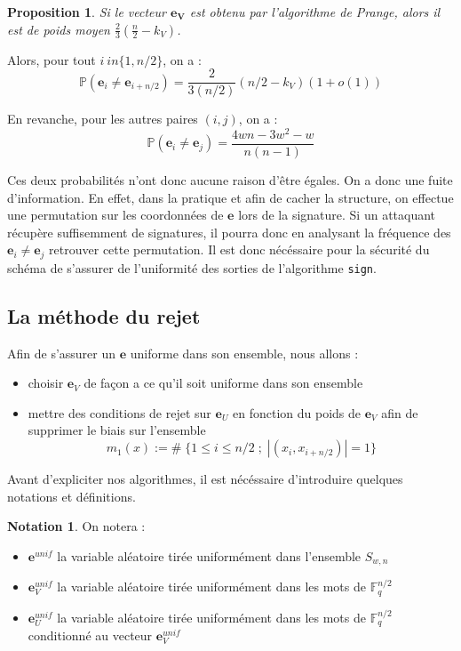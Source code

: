 \documentclass[12pt]{article}
\theoremstyle{plain}
\newtheorem{propo}[thm]{Proposition}
\theoremstyle{definition}
\newtheorem{nota}[thm]{Notation}
\newcommand{\F}{\mathbb{F}}
\newcommand{\e}{\mathbf{e}}
\begin{document}
\begin{propo}
Si le vecteur $\mathbf{e_V}$ est obtenu par l'algorithme de Prange, alors il est de poids moyen $\frac{2}{3}(\frac{n}{2}-k_V)$.
\end{propo}



Alors, pour tout $i \ in \{1,n/2\}$, on a :
$$ \mathbb{P}(\mathbf{e}_i \neq \mathbf{e}_{i+n/2}) = \frac{2}{3(n/2)}(n/2-k_V)(1+o(1))$$

\noindent En revanche, pour les autres paires $(i,j)$, on a :
$$ \mathbb{P}(\mathbf{e}_i \neq \mathbf{e}_{j}) = \frac{4wn - 3w^2-w}{n(n-1)}$$

Ces deux probabilités n'ont donc aucune raison d'être égales. On a donc une fuite d'information. En effet, dans la pratique et afin de cacher la structure, on effectue une permutation sur les coordonnées de $\mathbf{e}$ lors de la signature. Si un attaquant récupère suffisemment de signatures, il pourra donc en analysant la fréquence des $\mathbf{e}_i \neq \mathbf{e}_j$ retrouver cette permutation. Il est donc nécéssaire pour la sécurité du schéma de s'assurer de l'uniformité des sorties de l'algorithme \verb|sign|.

\subsection{La méthode du rejet}
Afin de s'assurer un $\mathbf{e}$ uniforme dans son ensemble, nous allons :
\begin{itemize}
\item choisir $\mathbf{e}_V$ de façon a ce qu'il soit uniforme dans son ensemble 
\item mettre des conditions de rejet sur $\mathbf{e}_U$ en fonction du poids de $\mathbf{e}_V$ afin de supprimer le biais sur l'ensemble 
$$ m_1(x) := \# \; \{1  \leq i \leq n/2 \;;\; |(x_i, x_{i+n/2})| = 1\}$$
\end{itemize}
Avant d'expliciter nos algorithmes, il est nécéssaire d'introduire quelques notations et définitions. \\

\begin{nota} On notera :
\begin{itemize}
\item $\mathbf{e}^{unif}$ la variable aléatoire tirée uniformément dans l'ensemble $S_{w,n}$
\item $\mathbf{e}_V^{unif}$ la variable aléatoire tirée uniformément dans les mots de $\F_q^{n/2}$ 
\item $\mathbf{e}_U^{unif}$ la variable aléatoire tirée uniformément dans les mots de $\F_q^{n/2}$ conditionné au vecteur $\e_V^{unif}$
\end{itemize}
\end{nota}
\end{document}
